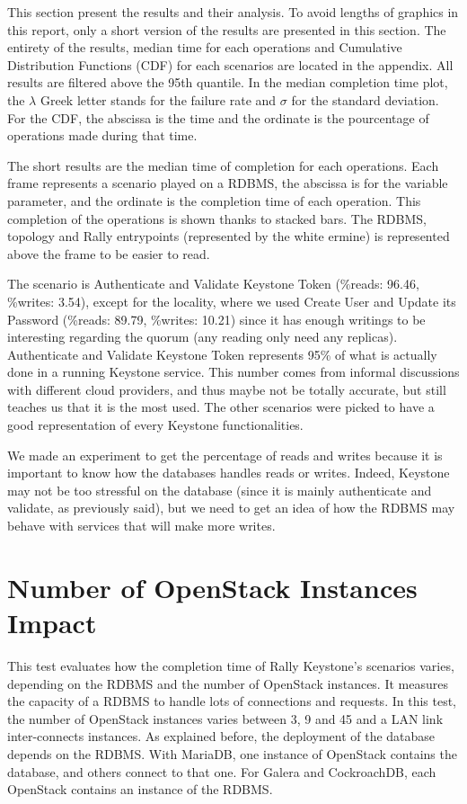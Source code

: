 This section present the results and their analysis. To avoid lengths of graphics in this report, only a short version of the results are presented in this section. The entirety of the results, median time for each operations and Cumulative Distribution Functions (CDF) for each scenarios are located in the appendix. All results are filtered above the 95th quantile. In the median completion time plot, the $\lambda$ Greek letter stands for the failure rate and $\sigma$ for the standard deviation. For the CDF, the abscissa is the time and the ordinate is the pourcentage of operations made during that time.



The short results are the median time of completion for each operations. Each frame represents a scenario played on a RDBMS, the abscissa is for the variable parameter, and the ordinate is the completion time of each operation. This completion of the operations is shown thanks to stacked bars. The RDBMS, topology and Rally entrypoints (represented by the white ermine) is represented above the frame to be easier to read.

The scenario is Authenticate and Validate Keystone Token (\%reads: 96.46, \%writes: 3.54), except for the locality, where we used Create User and Update its Password (\%reads: 89.79, \%writes: 10.21) since it has enough writings to be interesting regarding the quorum (any reading only need any replicas). Authenticate and Validate Keystone Token represents 95\% of what is actually done in a running Keystone service. This number comes from informal discussions with different cloud providers, and thus maybe not be totally accurate, but still teaches us that it is the most used. The other scenarios were picked to have a good representation of every Keystone functionalities.


We made an experiment to get the percentage of reads and writes because it is important to know how the databases handles reads or writes. Indeed, Keystone may not be too stressful on the database (since it is mainly authenticate and validate, as previously said), but we need to get an idea of how the RDBMS may behave with services that will make more writes.



\section{Number of OpenStack Instances Impact}

This test evaluates how the completion time of Rally Keystone’s scenarios varies, depending on the RDBMS and the number of OpenStack instances. It measures the capacity of a RDBMS to handle lots of connections and requests. In this test, the number of OpenStack instances varies between 3, 9 and 45 and a LAN link inter-connects instances. As explained before, the deployment of the database depends on the RDBMS. With MariaDB, one instance of OpenStack contains the database, and others connect to that one. For Galera and CockroachDB, each OpenStack contains an instance of the RDBMS.

